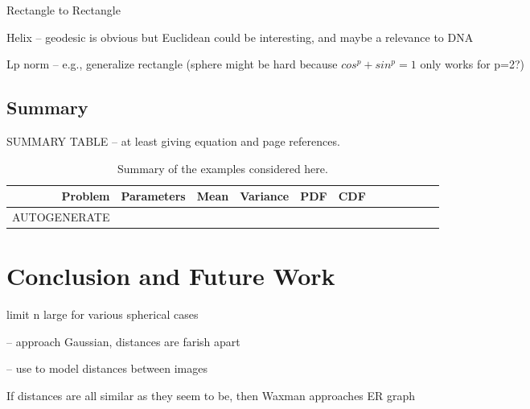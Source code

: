 \documentclass{article}
\begin{document}
Rectangle to Rectangle

Helix -- geodesic is obvious but Euclidean could be interesting, and
maybe a relevance to DNA
 

Lp norm -- e.g., generalize rectangle (sphere might be hard because
$cos^p+sin^p=1$ only works for p=2?)



\clearpage
\subsection{Summary}
SUMMARY TABLE -- at least giving equation and page references.

\begin{table}[ht]
  \centering
  \begin{tabular}{r|lllllllllll}
    Problem & Parameters & Mean & Variance & PDF & CDF \\
    \hline
    AUTOGENERATE
  \end{tabular}
  \caption{Summary of the examples considered here.}
  \label{tab:summary}
\end{table}

\clearpage


\clearpage


\clearpage


\clearpage


 
\clearpage
\section{Conclusion and Future Work}


limit n large for various spherical cases

  -- approach Gaussian, distances are farish apart

  -- use to model distances between images

If distances are all similar as they seem to be, then Waxman
approaches ER graph 

\appendix 

\clearpage



\setlength{\parskip}{1mm}

% 

\end{document}
